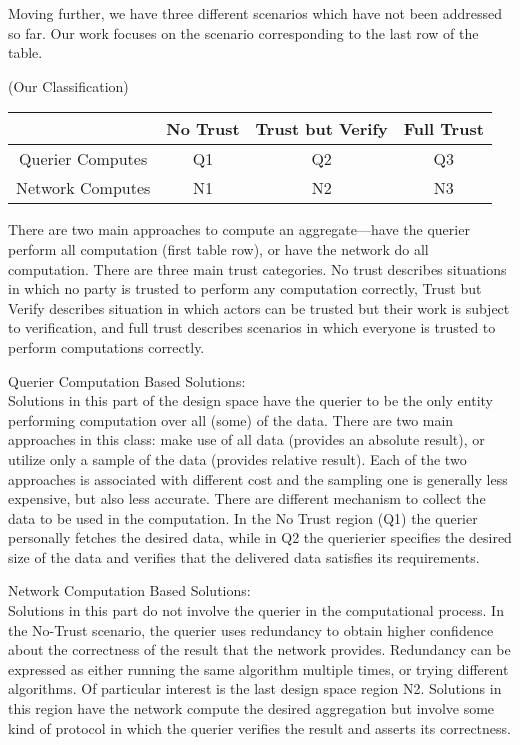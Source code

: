 \documentclass[11pt,twocolumn]{MyTightStyle}
\theoremstyle{plain}
\theoremstyle{definition}
\theoremstyle{remark}
\numberwithin{equation}{section}
\begin{document}
Moving further, we have three different scenarios which have not been
addressed so far. Our work focuses on the scenario corresponding to
the last row of the table. 
  

(Our Classification)
\begin{table}[htpb!]
  \begin{tabular}{|c|c|c|c|}
    \hline
    & No Trust & Trust but Verify & Full Trust\\
    \hline
    Querier Computes & Q1 & Q2 & Q3\\
    Network Computes & N1 & N2 & N3\\
    \hline
  \end{tabular}
\end{table}

There are two main approaches to compute an aggregate---have the
querier perform all computation (first table row), or have the network do
all computation. There are three main trust categories. No trust
describes situations in which no party is trusted to perform any
computation correctly, Trust but Verify describes situation in which
actors can be trusted but their work is subject to verification, and
full trust describes scenarios in which everyone is trusted to perform
computations correctly.

Querier Computation Based Solutions:\\
Solutions in this part of the design space have the querier to be the
only entity performing computation over all (some) of the data. There
are two main approaches in this class: make use of all data (provides
an absolute result), or utilize only a sample of the data (provides
relative result). Each of the two approaches is associated with
different cost and the sampling one is generally less expensive, but
also less accurate. There are different mechanism to collect the data
to be used in the computation. In the No Trust region (Q1) the
querier personally fetches the desired data, while in Q2 the querierier
specifies the desired size of the data and verifies that the delivered
data satisfies its requirements. 


Network Computation Based Solutions:\\
Solutions in this part do not involve the querier in the computational
process. In the No-Trust scenario, the querier uses redundancy to
obtain higher confidence about the correctness of the result that the
network provides. Redundancy can be expressed as either running the
same algorithm multiple times, or trying different algorithms. Of
particular interest is the last design space region N2. Solutions in
this region have the network compute the desired aggregation but
involve some kind of protocol in which the querier verifies the result
and asserts its correctness. 
\end{document}

